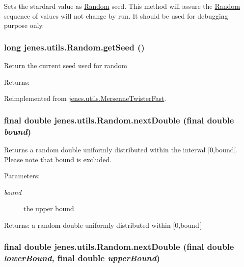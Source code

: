 Sets the stardard value as \hyperlink{classjenes_1_1utils_1_1_random}{Random} seed. This method will assure the \hyperlink{classjenes_1_1utils_1_1_random}{Random} sequence of values will not change by run. It should be used for debugging purpose only. \hypertarget{classjenes_1_1utils_1_1_random_55f9b0a836c137e520658f55ad806859}{
\subsubsection[getSeed]{\setlength{\rightskip}{0pt plus 5cm}long jenes.utils.Random.getSeed ()}}
\label{classjenes_1_1utils_1_1_random_55f9b0a836c137e520658f55ad806859}


Return the current seed used for random \begin{Desc}
\item[Returns:]\end{Desc}


Reimplemented from \hyperlink{classjenes_1_1utils_1_1_mersenne_twister_fast_88963c0469e0bad7a1834469cf0f7a10}{jenes.utils.MersenneTwisterFast}.\hypertarget{classjenes_1_1utils_1_1_random_be2919ddf9245e0576591fa0ea26593f}{
\subsubsection[nextDouble]{\setlength{\rightskip}{0pt plus 5cm}final double jenes.utils.Random.nextDouble (final double {\em bound})}}
\label{classjenes_1_1utils_1_1_random_be2919ddf9245e0576591fa0ea26593f}


Returns a random double uniformly distributed within the interval \mbox{[}0,bound\mbox{[}. Please note that bound is excluded. 

\begin{Desc}
\item[Parameters:]
\begin{description}
\item[{\em bound}]the upper bound \end{description}
\end{Desc}
\begin{Desc}
\item[Returns:]a random double uniformly distributed within \mbox{[}0,bound\mbox{[} \end{Desc}
\hypertarget{classjenes_1_1utils_1_1_random_19babaa9c19de0243430cef2c445df9c}{
\subsubsection[nextDouble]{\setlength{\rightskip}{0pt plus 5cm}final double jenes.utils.Random.nextDouble (final double {\em lowerBound}, \/  final double {\em upperBound})}}
\label{classjenes_1_1utils_1_1_random_19babaa9c19de0243430cef2c445df9c}


